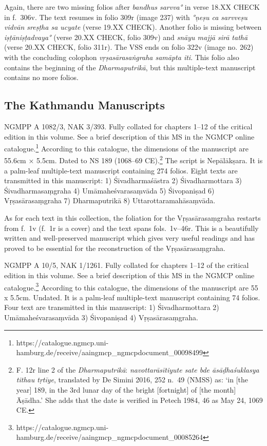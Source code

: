 \documentclass[11pt]{book}
\begin{document}
Again, there are two missing folios after \emph{bandhus sarvva°} in
verse 18.XX CHECK in f.~306v. The text resumes in folio 309r (image 237)
with \emph{°ṇeṣu ca sarvveṣu vidvān sreṣṭha sa ucyate} (verse 19.XX
CHECK). Another folio is missing between \emph{iṣṭāniṣṭadvaya°} (verse
20.XX CHECK, folio 309v) and \emph{snāyu majjā sirā tathā} (verse 20.XX
CHECK, folio 311r). The VSS ends on folio 322v (image no. 262) with the
concluding colophon \emph{vṛṣasārasaṅgraha samāpta iti}. This folio also
contains the beginning of the \emph{Dharmaputrikā}, but this
multiple-text manuscript contains no more folios.


\subsection{The Kathmandu Manuscripts}

NGMPP A 1082/3, NAK 3/393. Fully collated for chapters 1--12 of the
critical edition in this volume. See a brief description of this MS in
the NGMCP online catalogue.\footnote{https://catalogue.ngmcp.uni-hamburg.de/receive/aaingmcp\_ngmcpdocument\_00098499}
According to this catalogue, the dimensions of the manuscript are 55.6cm × 5.5cm. Dated to NS 189 (1068--69 CE).\footnote{F. 12r line 2 of the
  \emph{Dharmaputrikā}: \emph{navottarāsītiyute sate bde āsāḍhaśuklasya
  tithau tṛtīye}, translated by De Simini 2016, 252 n.~49 (NMSS) as: `in
  {[}the year{]} 189, in the 3rd lunar day of the bright {[}fortnight{]}
  of {[}the month{]} Āṣādha.' She adds that the date is verified in
  Petech 1984, 46 as May 24, 1069 CE.} The script is Nepālākṣara. It is
a palm-leaf multiple-text manuscript containing 274 folios. Eight texts
are transmitted in this manuscript: 1) Śivadharmaśāstra 2)
Śivadharmottara 3) Śivadharmasaṃgraha 4) Umāmaheśvarasaṃvāda 5)
Śivopaniṣad 6) Vṛṣasārasaṃgraha 7) Dharmaputrikā 8)
Uttarottaramahāsaṃvāda.

As for each text in this collection, the foliation for the
Vṛṣasārasaṃgraha restarts from f.~1v (f.~1r is a cover) and the text
spans fols.~1v--46r. This is a beautifully written and well-preserved
manuscript which gives very useful readings and has proved to be
essential for the reconstruction of the Vṛṣasārasaṃgraha.


NGMPP A 10/5, NAK 1/1261. Fully collated for chapters 1--12 of the
critical edition in this volume. See a brief description of this MS in
the NGMCP online catalogue.\footnote{https://catalogue.ngmcp.uni-hamburg.de/receive/aaingmcp\_ngmcpdocument\_00085264}
According to this catalogue, the dimensions of the manuscript are 55 x
5.5cm. Undated. It is a palm-leaf multiple-text manuscript containing 74
folios. Four text are transmitted in this manuscript: 1) Śivadharmottara
2) Umāmaheśvarasaṃvāda 3) Śivopaniṣad 4) Vṛṣasārasaṃgraha.
\end{document}

